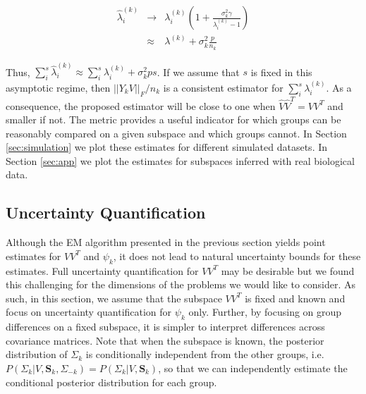 \documentclass{article}
\newcommand{\bl}[1]{{\mathbf #1}}
\begin{document}
\begin{eqnarray}
\hat{\lambda}^{(k)}_i &\rightarrow& \lambda^{(k)}_i\left(1 +
                                    \frac{\sigma_k^2\gamma}{\lambda^{(k)}_i
                                    - 1}\right)\\
& \approx& \lambda^{(k)} + \sigma^2_k\frac{p}{n_k}
\end{eqnarray}

Thus,
$\sum_i^s \hat{\lambda}^{(k)}_i \approx \sum_i^s \lambda^{(k)}_i +
\sigma_k^2ps$.
If we assume that $s$ is fixed in this asymptotic regime, then
$||Y_kV||_F/n_k$ is a consistent estimator for
$\sum_i^s \lambda^{(k)}_i$.  As a consequence, the proposed estimator will be close
to one when $\hat{V}\hat{V}^T = VV^T$ and smaller if not.  The metric provides a
useful indicator for which groups can be reasonably compared on a
given subspace and which groups cannot.  In Section \ref{sec:simulation} we plot
these estimates for different simulated datasets.  In Section \ref{sec:app}
we plot the estimates for subspaces  inferred with real biological data.

\subsection{Uncertainty Quantification}
\label{sec:bayes}

Although the EM algorithm presented in the previous section yields
point estimates for $VV^T$ and $\psi_k$, it does not lead to natural
uncertainty bounds for these estimates. Full uncertainty
quantification for $VV^T$ may be desirable but we found this
challenging for the dimensions of the problems we would like to
consider.  As such, in this section, we assume that the subspace
$VV^T$ is fixed and known and focus on uncertainty quantification for
$\psi_k$ only.  Further, by focusing on group differences on a fixed
subspace, it is simpler to interpret differences across covariance
matrices.  %
Note that when the subspace is known, the posterior distribution of
$\Sigma_k$ is conditionally independent from the other groups, i.e.
$P(\Sigma_{k} | V, \bl S_k, \Sigma_{-k}) = P(\Sigma_{k} | V, \bl
S_k)$,
so that we can independently estimate the conditional posterior
distribution for each group.
\end{document}
